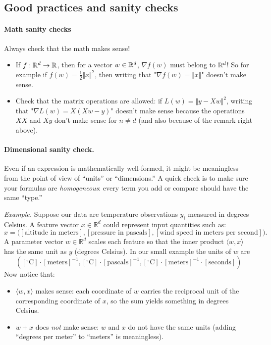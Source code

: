 \subsection{Good practices and sanity checks}

\paragraph{Math sanity checks} Always check that the math makes sense! 

\begin{itemize}
    \item  If $f : \mathbb{R}^d \to \mathbb{R}$, then for a vector $w \in \mathbb{R}^d$, $\nabla f(w)$ must belong to $\mathbb{R}^d$! So for example if $f(w) = \frac{1}{2} \Vert x \Vert^2$, then writing that "$\nabla f(w) = \Vert x \Vert$" doesn't make sense. 
    \item Check that the matrix operations are allowed: if $L(w) = \Vert y - X w \Vert^2$, writing that "$\nabla L(w) = X (X w -y)$" doesn't make sense because the operations $X X$ and $X y$ don't make sense for $n \neq d$ (and also because of the remark right above).
\end{itemize}


\paragraph{Dimensional sanity check.}  
Even if an expression is mathematically well-formed, it might be meaningless from the point of view of ``units'' or ``dimensions.''  
A quick check is to make sure your formulas are \emph{homogeneous}: every term you add or compare should have the same ``type.'' 
 
\noindent
\textit{Example.} Suppose our data are temperature observations $y_i$ measured in degrees Celsius. A feature vector $x \in \mathbb{R}^d$ could represent input quantities such as:
\[
x = \big([\text{altitude in meters}], [\text{pressure in pascals}], [\text{wind speed in meters per second}] \big).
\]
A parameter vector $w \in \mathbb{R}^d$ scales each feature so that the inner product $\langle w, x \rangle$
has the same unit as $y$ (degrees Celsius). In our small example the units of $w$ are 
\[ ([^\circ\mathrm{C}] \cdot [\text{meters}]^{-1}, [^\circ\mathrm{C}] \cdot [\text{pascals}]^{-1}, [^\circ\mathrm{C}] \cdot [\text{meters}]^{-1} \cdot [\text{seconds}]) \]
Now notice that:
\begin{itemize}
    \item $\langle w, x \rangle$ makes sense: each coordinate of $w$ carries the reciprocal unit of the corresponding coordinate of $x$, so the sum yields something in degrees Celsius.  
    \item $w + x$ does \emph{not} make sense: $w$ and $x$ do not have the same units (adding ``degrees per meter'' to ``meters'' is meaningless).  
\end{itemize}


